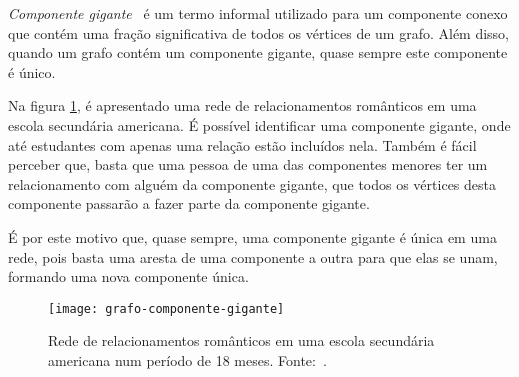 \emph{Componente gigante}~\cite{easley2010networks} é um termo informal utilizado para
um componente conexo que contém uma fração significativa de todos os vértices de um grafo. Além disso, quando um grafo contém um componente gigante, quase sempre este componente é único.

Na figura \ref{fig:grafo-componente-gigante}, é apresentado uma rede de relacionamentos românticos em uma escola secundária americana. É possível identificar uma componente gigante, onde até estudantes com apenas uma relação estão incluídos nela. Também é fácil perceber que, basta que uma pessoa de uma das componentes menores ter um relacionamento com alguém da componente gigante, que todos os vértices desta componente passarão a fazer parte da componente gigante.

É por este motivo que, quase sempre, uma componente gigante é única em uma rede, pois basta uma aresta de uma componente a outra para que elas se unam, formando uma nova componente única.

\begin{figure}[H]
\texttt{[image: grafo-componente-gigante]}
\centering
\caption{
    Rede de relacionamentos românticos em uma escola secundária americana num período de 18 meses. Fonte:~\cite{bearman2004chains}.
}
\label{fig:grafo-componente-gigante}
\end{figure}






